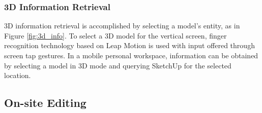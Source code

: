 \subsubsection{3D Information Retrieval}

3D information retrieval is accomplished by selecting a model's entity, as in Figure \ref{fig:3d_info}. To select a 3D model for the vertical screen, finger recognition technology based on Leap Motion is used with input offered through screen tap gestures. In a mobile personal workspace, information can be obtained by selecting a model in 3D mode and querying SketchUp for the selected location.

\subsection{On-site Editing}


